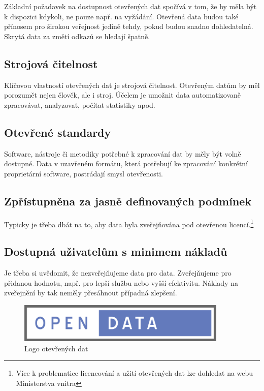 Základní požadavek na dostupnost otevřených dat spočívá v tom, že by měla být k dispozici kdykoli, ne pouze např. na vyžádání. Otevřená data budou také přínosem pro širokou veřejnost jedině tehdy, pokud budou snadno dohledatelná. Skrytá data za změtí odkazů se hledají špatně.

\subsection*{Strojová čitelnost}

Klíčovou vlastností otevřených dat je strojová čitelnost. Otevřeným datům by měl porozumět nejen člověk, ale i stroj. Účelem je umožnit data automatizovaně zpracovávat, analyzovat, počítat statistiky apod.

\subsection*{Otevřené standardy}

Software, nástroje či metodiky potřebné k zpracování dat by měly být volně dostupné. Data v uzavřeném formátu, která potřebují ke zpracování konkrétní proprietární software, postrádají smysl otevřenosti.

\subsection*{Zpřístupněna za jasně definovaných podmínek}

Typicky je třeba dbát na to, aby data byla zveřejňována pod otevřenou licencí.\footnote{Více k problematice licencování a užití otevřených dat lze dohledat na webu Ministerstva vnitra\cite{mv}}

\subsection*{Dostupná uživatelům s minimem nákladů}

Je třeba si uvědomit, že nezveřejňujeme data pro data. Zveřejňujeme pro přidanou hodnotu, např. pro lepší službu nebo vyšší efektivitu. Náklady na zveřejnění by tak neměly přesáhnout případná zlepšení. 
\newline

\begin{figure}[h]
\centerline{\includegraphics[width=100mm]{img/opendata.eps}}
\caption{Logo otevřených dat}
\label{obr:logo}
\end{figure}

